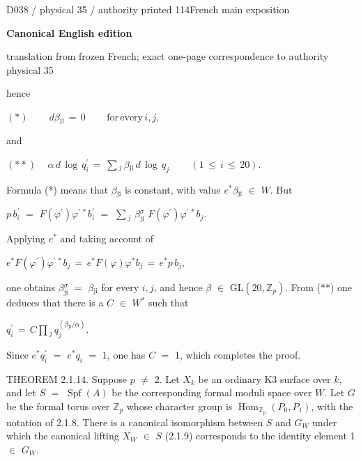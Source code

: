 \documentclass[9pt]{article}
\newcommand{\CanonText}[1]{\par{\fontsize{8.0}{9.35}\selectfont\RaggedRight #1\par}\vspace{2.2pt}}
\newcommand{\CanonDisplay}[1]{\par\vspace{1.2pt}\begin{center}{\fontsize{7.2}{8.4}\selectfont\(\displaystyle #1\)}\end{center}\vspace{1.2pt}}
\newcommand{\LayerTitle}{Canonical English edition}
\begin{document}
\noindent\begin{minipage}[t][\dimexpr\textheight-5pt\relax][t]{\textwidth}
{\sffamily\fontsize{7.3}{8.2}\selectfont\color{Quiet} D038 / physical 35 / authority printed 114\hfill French main exposition}
\par{}\vspace{4.5pt}
{\sffamily\fontsize{10.4}{11.6}\selectfont\bfseries\color{Accent} \LayerTitle}
\par{\sffamily\fontsize{6.7}{7.7}\selectfont\color{Quiet} translation from frozen French; exact one-page correspondence to authority physical 35}
\vspace{5pt}
\CanonText{hence}
\CanonDisplay{(*)\qquad\,d\beta{}_{\mathrm{ji}}\,=\,0\qquad\,\text{for}\,\text{every}\,i,j,}
\CanonText{and}
\CanonDisplay{(**)\quad\,\alpha{}\,d\,\operatorname{log}\,q^{\prime}_{i}\,=\,\sum{}_{j}\,\beta{}_{\mathrm{ji}}\,d\,\operatorname{log}\,q_{j}\qquad\,(1\,\leq{}\,i\,\leq{}\,20).}
\CanonText{Formula (*) means that \(\beta{}_{\mathrm{ji}}\) is constant, with value \(e^{*}\beta{}_{\mathrm{ji}}\) \(\in{}\) \(W\). But}
\CanonText{\(p\,b^{\prime}_{i}\) \(=\) \(F(\varphi{}^{\prime})\varphi{}^{\prime\,*}b^{\prime}_{i}\) \(=\) \(\sum{}_{j}\) \(\beta{}_{\mathrm{ji}}^\sigma{}\) \(F(\varphi{}^{\prime})\varphi{}^{\prime\,*}b_{j}\).}
\CanonText{Applying \(e^{*}\) and taking account of}
\CanonDisplay{e^{*}F(\varphi{}^{\prime})\varphi{}^{\prime\,*}b_{j}\,=\,e^{*}F(\varphi{})\varphi{}^{*}b_{j}\,=\,e^{*}p\,b_{j},}
\CanonText{one obtains \(\beta{}_{\mathrm{ji}}^\sigma{}\) \(=\) \(\beta{}_{\mathrm{ji}}\) for every \(i,j\), and hence \(\beta{}\) \(\in{}\) \(\mathrm{GL}(20,\mathbb{Z}_{p})\). From (**) one deduces that there is a \(C\) \(\in{}\) \(W^{*}\) such that}
\CanonDisplay{q^{\prime}_{i}\,=\,C\prod{}_{j}\,q_{j}^{(\beta{}_{\mathrm{ji}}/\alpha{})}.}
\CanonText{Since \(e^{*}q^{\prime}_{i}\) \(=\) \(e^{*}q_{i}\) \(=\) 1, one has \(C\) \(=\) 1, which completes the proof.}
\CanonText{THEOREM 2.1.14. Suppose \(p\) \(\neq{}\) 2. Let \(X_{k}\) be an ordinary K3 surface over \(k\), and let \(S\) \(=\) \(\operatorname{Spf}(A)\) be the corresponding formal moduli space over \(W\). Let \(G\) be the formal torus over \(\mathbb{Z}_{p}\) whose character group is \(\operatorname{Hom}_{\mathbb{Z}_{p}}(P_{0},P_{1})\), with the notation of 2.1.8. There is a canonical isomorphism between \(S\) and \(G_{W}\) under which the canonical lifting \(X_{W}\) \(\in{}\) \(S\) (2.1.9) corresponds to the identity element 1 \(\in{}\) \(G_{W}\).}

\end{minipage}
\end{document}
